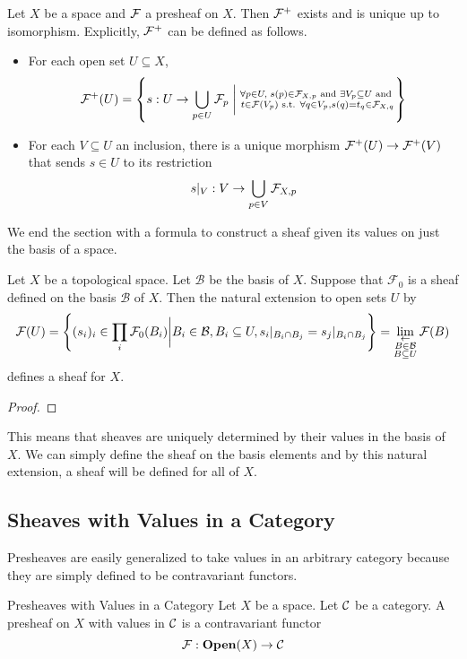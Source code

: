 \documentclass[a4paper]{article}
\begin{document}
\begin{thm}{}{} Let $X$ be a space and $\mathcal{F}$ a presheaf on $X$. Then $\mathcal{F}^+$ exists and is unique up to isomorphism. Explicitly, $\mathcal{F}^+$ can be defined as follows. 
\begin{itemize}
\item For each open set $U\subseteq X$, $$\mathcal{F}^+(U)=\left\{s:U\to\bigcup_{p\in U}\mathcal{F}_p\;\bigg{|}\;\substack{\forall p\in U,\;s(p)\in\mathcal{F}_{X,p}\text{ and }\exists V_p\subseteq U\text{ and }\\t\in\mathcal{F}(V_p)\text{ s.t. }\forall q\in V_p, s(q)=t_q\in\mathcal{F}_{X,q}}\right\}$$
\item For each $V\subseteq U$ an inclusion, there is a unique morphism $\mathcal{F}^+(U)\to\mathcal{F}^+(V)$ that sends $s\in U$ to its restriction $$s|_V:V\to\bigcup_{p\in V}\mathcal{F}_{X,p}$$
\end{itemize}
\end{thm}

We end the section with a formula to construct a sheaf given its values on just the basis of a space. 

\begin{thm}{}{} Let $X$ be a topological space. Let $\mathcal{B}$ be the basis of $X$. Suppose that $\mathcal{F}_0$ is a sheaf defined on the basis $\mathcal{B}$ of $X$. Then the natural extension to open sets $U$ by $$\mathcal{F}(U)=\left\{(s_i)_i\in\prod_i\mathcal{F}_0(B_i)\bigg{|}B_i\in\mathcal{B}, B_i\subseteq U, s_i|_{B_i\cap B_j}=s_j|_{B_i\cap B_j}\right\}=\lim_{\substack{\leftarrow\\B\in\mathcal{B}\\B\subseteq U}}\mathcal{F}(B)$$ defines a sheaf for $X$. \tcbline
\begin{proof}

\end{proof}
\end{thm}

This means that sheaves are uniquely determined by their values in the basis of $X$. We can simply define the sheaf on the basis elements and by this natural extension, a sheaf will be defined for all of $X$. 

\subsection{Sheaves with Values in a Category}
Presheaves are easily generalized to take values in an arbitrary category because they are simply defined to be contravariant functors. 

\begin{defn}{Presheaves with Values in a Category}{} Let $X$ be a space. Let $\mathcal{C}$ be a category. A presheaf on $X$ with values in $\mathcal{C}$ is a contravariant functor $$\mathcal{F}:\bold{Open}(X)\to\mathcal{C}$$
\end{defn}
\end{document}
